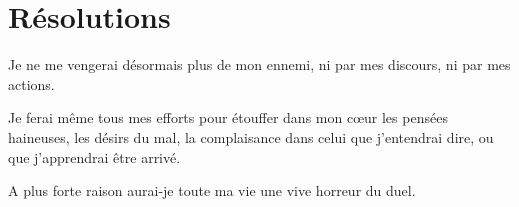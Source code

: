 \documentclass[instructions.tex]{subfiles}
\begin{document}
\section{Résolutions}
 
\primo Je ne me vengerai désormais plus de mon ennemi, ni par mes discours, ni par mes actions. 

\secundo Je ferai même tous mes efforts pour étouffer dans mon cœur les pensées haineuses, les désirs du mal, la complaisance dans celui que j’entendrai dire, ou que j’apprendrai être arrivé.

\tertio A plus forte raison aurai-je toute ma vie une vive horreur du duel. 

 
\end{document}

